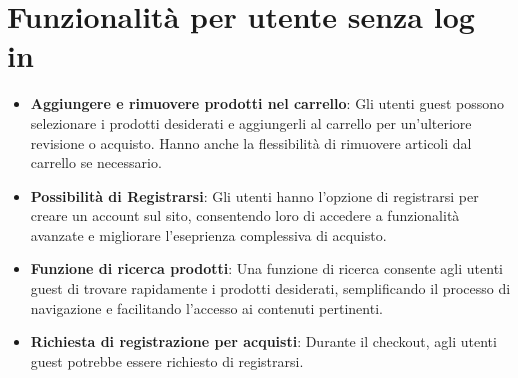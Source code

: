 \section{Funzionalità per utente senza log in}
\begin{itemize}
    \item \textbf{Aggiungere e rimuovere prodotti nel carrello}: Gli utenti guest possono selezionare i prodotti desiderati e aggiungerli al carrello per un'ulteriore revisione o acquisto. Hanno anche la flessibilità di rimuovere articoli dal carrello se necessario.
    \item \textbf{Possibilità di Registrarsi}: Gli utenti hanno l'opzione di registrarsi per creare un account sul sito, consentendo loro di accedere a funzionalità avanzate e migliorare l'eseprienza complessiva di acquisto.
    \item \textbf{Funzione di ricerca prodotti}: Una funzione di ricerca consente agli utenti guest di trovare rapidamente i prodotti desiderati, semplificando il processo di navigazione e facilitando l'accesso ai contenuti pertinenti.
    \item \textbf{Richiesta di registrazione per acquisti}: Durante il checkout, agli utenti guest potrebbe essere richiesto di registrarsi.
\end{itemize}